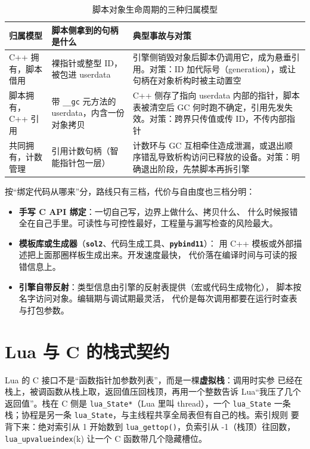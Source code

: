 \documentclass[12pt,a4paper,fontset=fandol]{ctexbook}
\newcommand{\Fn}[1]{\texttt{#1()}}
\newcommand{\Tp}[1]{\texttt{#1}}
\newcommand{\Lib}[1]{\textbf{\texttt{#1}}}
\begin{document}
\begin{table}[htbp]
\centering
\footnotesize
\caption{脚本对象生命周期的三种归属模型}
\label{tab:ch14-lifetime}
\begin{tabular}{>{\raggedright\arraybackslash}p{}
                >{\raggedright\arraybackslash}p{}
                >{\raggedright\arraybackslash}p{}}
\toprule
归属模型 & 脚本侧拿到的句柄是什么 & 典型事故与对策 \\
\midrule
C++ 拥有，脚本借用 & 裸指针或整型 ID，被包进 userdata & 引擎侧销毁对象后脚本仍调用它，成为悬垂引用。对策：ID 加代际号（generation），或让句柄在对象析构时被主动置空 \\
脚本拥有，C++ 引用 & 带 \Tp{\_\_gc} 元方法的 userdata，内含一份对象拷贝 & C++ 侧存了指向 userdata 内部的指针，脚本表被清空后 GC 何时跑不确定，引用先发失效。对策：跨界只传值或传 ID，不传内部指针 \\
共同拥有，计数管理 & 引用计数句柄（智能指针包一层） & 计数环与 GC 互相牵住造成泄漏，或退出顺序错乱导致析构访问已释放的设备。对策：明确退出阶段，先禁脚本再拆引擎 \\
\bottomrule
\end{tabular}
\end{table}

按``绑定代码从哪来''分，路线只有三档，代价与自由度也三档分明：

\begin{itemize}
  \item \textbf{手写 C API 绑定}：一切自己写，边界上做什么、拷贝什么、
        什么时候报错全在自己手里。可读性与可控性最好，工程量与漏写检查的风险最大。
  \item \textbf{模板库或生成器}（\Lib{sol2}、代码生成工具、\Lib{pybind11}）：
        用 C++ 模板或外部描述把上面那圈样板生成出来。开发速度最快，
        代价落在编译时间与可读的报错信息上。
  \item \textbf{引擎自带反射}：类型信息由引擎的反射表提供（宏或代码生成物化），
        脚本按名字访问对象。编辑期与调试期最灵活，
        代价是每次调用都要在运行时查表与打包参数。
\end{itemize}

\section{Lua 与 C 的栈式契约}
\label{sec:ch14-lua-stack}

Lua 的 C 接口不是``函数指针加参数列表''，而是一棵\textbf{虚拟栈}：调用时实参
已经在栈上，被调函数从栈上取，返回值压回栈顶，再用一个整数告诉 Lua``我压了几个
返回值''。栈在 C 侧是 \Tp{lua\_State*}（Lua 里叫 thread），一个 \Tp{lua\_State}
一条栈；协程是另一条 \Tp{lua\_State}，与主线程共享全局表但有自己的栈。索引规则
要背下来：绝对索引从 1 开始数到 \Fn{lua\_gettop}，负索引从 -1（栈顶）往回数，
\Tp{lua\_upvalueindex}(k) 让一个 C 函数带几个隐藏槽位。
\end{document}
